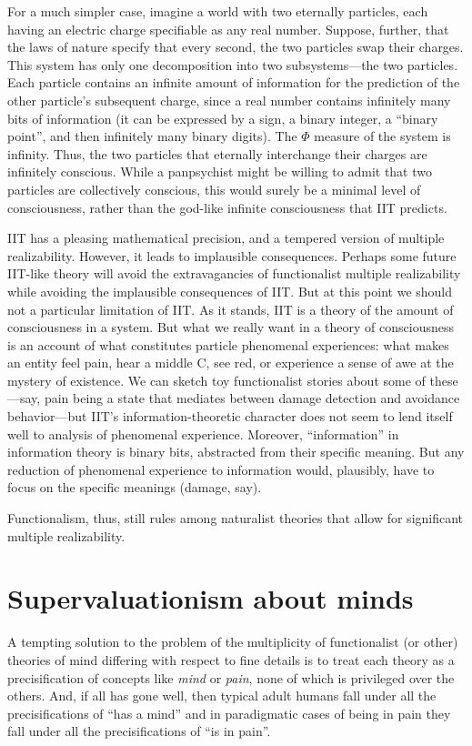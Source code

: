 For a much simpler case, imagine a world with two eternally particles, each having an electric charge specifiable
as any real number. Suppose, further, that the laws of nature specify that every second, the two particles swap their charges. This system has only one decomposition into two subsystems---the two particles. Each particle contains 
an infinite amount of information for the prediction of the other particle's subsequent charge, since a real
number contains infinitely many bits of information (it can be expressed by a sign, a binary integer, a ``binary 
point'', and then infinitely many binary digits). The $\Phi$ measure of the system is infinity. Thus, the two 
particles that eternally interchange their charges are infinitely conscious. While a panpsychist might be willing to 
admit that two particles are collectively conscious, this would surely be a minimal level of consciousness, rather than 
the god-like infinite consciousness that IIT predicts.

IIT has a pleasing mathematical precision, and a tempered version of multiple realizability. However, it leads to 
implausible consequences. Perhaps some future IIT-like theory will avoid the extravagancies of functionalist multiple
realizability while avoiding the implausible consequences of IIT. But at this point we should not a particular 
limitation of IIT. As it stands, IIT is a theory of the amount of consciousness in a system. But what we really 
want in a theory of consciousness is an account of what constitutes particle phenomenal experiences: what makes 
an entity feel pain, hear a middle C, see red, or experience a sense of awe at the mystery of existence. We can 
sketch toy functionalist stories about some of these---say, pain being a state that mediates between damage detection
and avoidance behavior---but IIT's information-theoretic character does not seem to lend itself well to analysis of 
phenomenal experience. Moreover, ``information'' in information theory is binary bits, abstracted from their specific 
meaning. But any reduction of phenomenal experience to information would, plausibly, have to focus on the specific 
meanings (damage, say). 

Functionalism, thus, still rules among naturalist theories that allow for significant multiple realizability.

\section{Supervaluationism about minds}
A tempting solution to the problem of the multiplicity of functionalist (or other) theories of mind differing with respect
to fine details is to treat each theory as a precisification of concepts like \textit{mind} or \textit{pain}, none of which
is privileged over the others. And,
if all has gone well, then typical adult humans fall under all the precisifications of ``has a mind'' and in paradigmatic
cases of being in pain they fall under all the precisifications of ``is in pain''. 

